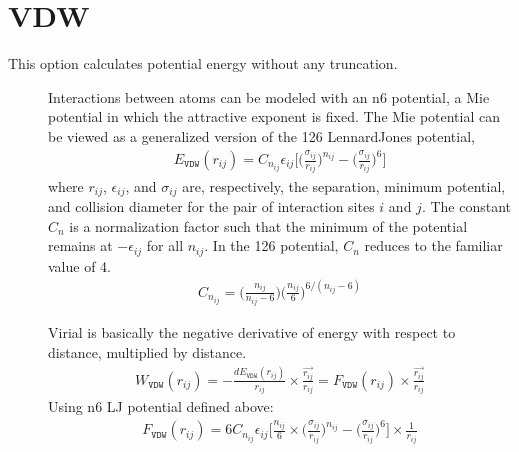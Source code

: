 \documentclass[letterpaper,10pt,english]{sphinxmanual}
\begin{document}
\section{VDW}
\label{\detokenize{vdw_energy:vdw}}
This option calculates potential energy without any truncation.
\begin{description}
\item[{}] \leavevmode
Interactions between atoms can be modeled with an n\sphinxhyphen{}6 potential, a Mie potential in which the attractive exponent is fixed. The Mie potential can be viewed as a generalized version of the 12\sphinxhyphen{}6 Lennard\sphinxhyphen{}Jones potential,
\begin{equation*}
\begin{split}E_{\texttt{VDW}}(r_{ij}) = C_{n_{ij}} \epsilon_{ij} \bigg[\bigg(\frac{\sigma_{ij}}{r_{ij}}\bigg)^{n_{ij}} - \bigg(\frac{\sigma_{ij}}{r_{ij}}\bigg)^6\bigg]\end{split}
\end{equation*}
where \(r_{ij}\), \(\epsilon_{ij}\), and \(\sigma_{ij}\) are, respectively, the separation, minimum potential, and collision diameter for the pair of interaction sites \(i\) and \(j\). The constant \(C_n\) is a normalization factor such that the minimum of the potential remains at \(-\epsilon_{ij}\) for all \(n_{ij}\). In the 12\sphinxhyphen{}6 potential, \(C_n\) reduces to the familiar value of 4.
\begin{equation*}
\begin{split}C_{n_{ij}} = \bigg(\frac{n_{ij}}{n_{ij} - 6} \bigg)\bigg(\frac{n_{ij}}{6} \bigg)^{6/(n_{ij} - 6)}\end{split}
\end{equation*}
\item[{}] \leavevmode
Virial is basically the negative derivative of energy with respect to distance, multiplied by distance.
\begin{equation*}
\begin{split}W_{\texttt{VDW}}(r_{ij}) = -\frac{dE_{\texttt{VDW}}(r_{ij})}{r_{ij}}\times \frac{\overrightarrow{r_{ij}}}{{r_{ij}}} = F_{\texttt{VDW}}(r_{ij}) \times \frac{\overrightarrow{r_{ij}}}{{r_{ij}}}\end{split}
\end{equation*}
Using n\sphinxhyphen{}6 LJ potential defined above:
\begin{equation*}
\begin{split}F_{\texttt{VDW}}(r_{ij}) = 6C_{n_{ij}} \epsilon_{ij} \bigg[\frac{n_{ij}}{6} \times \bigg(\frac{\sigma_{ij}}{r_{ij}}\bigg)^{n_{ij}} - \bigg(\frac{\sigma_{ij}}{r_{ij}}\bigg)^6\bigg]\times \frac{1}{{r_{ij}}}\end{split}
\end{equation*}
\end{description}
\end{document}
